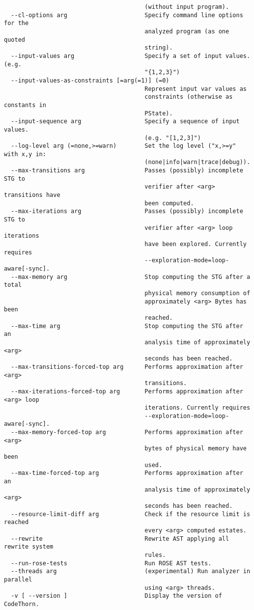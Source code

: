 \documentclass[natbib]{article}
\begin{document}
\begin{verbatim}
                                        (without input program).
  --cl-options arg                      Specify command line options for the 
                                        analyzed program (as one quoted 
                                        string).
  --input-values arg                    Specify a set of input values. (e.g. 
                                        "{1,2,3}")
  --input-values-as-constraints [=arg(=1)] (=0)
                                        Represent input var values as 
                                        constraints (otherwise as constants in 
                                        PState).
  --input-sequence arg                  Specify a sequence of input values. 
                                        (e.g. "[1,2,3]")
  --log-level arg (=none,>=warn)        Set the log level ("x,>=y" with x,y in:
                                        (none|info|warn|trace|debug)).
  --max-transitions arg                 Passes (possibly) incomplete STG to 
                                        verifier after <arg> transitions have 
                                        been computed.
  --max-iterations arg                  Passes (possibly) incomplete STG to 
                                        verifier after <arg> loop iterations 
                                        have been explored. Currently requires 
                                        --exploration-mode=loop-aware[-sync].
  --max-memory arg                      Stop computing the STG after a total 
                                        physical memory consumption of 
                                        approximately <arg> Bytes has been 
                                        reached.
  --max-time arg                        Stop computing the STG after an 
                                        analysis time of approximately <arg> 
                                        seconds has been reached.
  --max-transitions-forced-top arg      Performs approximation after <arg> 
                                        transitions.
  --max-iterations-forced-top arg       Performs approximation after <arg> loop
                                        iterations. Currently requires 
                                        --exploration-mode=loop-aware[-sync].
  --max-memory-forced-top arg           Performs approximation after <arg> 
                                        bytes of physical memory have been 
                                        used.
  --max-time-forced-top arg             Performs approximation after an 
                                        analysis time of approximately <arg> 
                                        seconds has been reached.
  --resource-limit-diff arg             Check if the resource limit is reached 
                                        every <arg> computed estates.
  --rewrite                             Rewrite AST applying all rewrite system
                                        rules.
  --run-rose-tests                      Run ROSE AST tests.
  --threads arg                         (experimental) Run analyzer in parallel
                                        using <arg> threads.
  -v [ --version ]                      Display the version of CodeThorn.
\end{verbatim}
\end{document}
